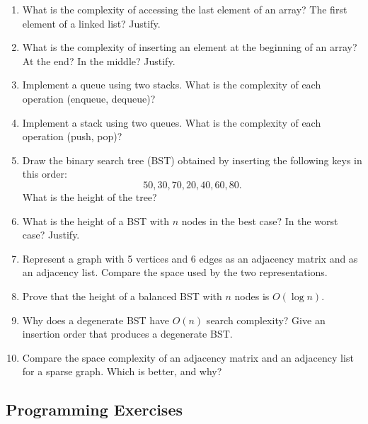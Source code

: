 \documentclass[11pt,a4paper]{article}
\newcommand{\easy}{$\star$}
\newcommand{\medium}{$\star\star$}
\newcommand{\hard}{$\star\star\star$}
\begin{document}
\begin{enumerate}[label=\textbf{2.\arabic*}]

    \item[\easy] What is the complexity of accessing the last element of an array? The first element of a linked list? Justify.

    \item[\easy] What is the complexity of inserting an element at the beginning of an array? At the end? In the middle? Justify.

    \item[\medium] Implement a queue using two stacks. What is the complexity of each operation (enqueue, dequeue)?

    \item[\medium] Implement a stack using two queues. What is the complexity of each operation (push, pop)?

    \item[\easy] Draw the binary search tree (BST) obtained by inserting the following keys in this order:
    \[
    50, 30, 70, 20, 40, 60, 80.
    \]
    What is the height of the tree?

    \item[\easy] What is the height of a BST with $n$ nodes in the best case? In the worst case? Justify.

    \item[\medium] Represent a graph with 5 vertices and 6 edges as an adjacency matrix and as an adjacency list. Compare the space used by the two representations.

    \item[\hard] Prove that the height of a balanced BST with $n$ nodes is $O(\log n)$.

    \item[\medium] Why does a degenerate BST have $O(n)$ search complexity? Give an insertion order that produces a degenerate BST.

    \item[\medium] Compare the space complexity of an adjacency matrix and an adjacency list for a sparse graph. Which is better, and why?

\end{enumerate}

\subsection{Programming Exercises}
\end{document}
